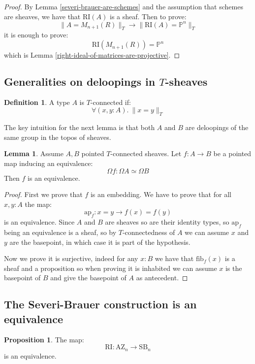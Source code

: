\documentclass[10pt,a4paper]{article}
\theoremstyle{definition}
\newtheorem{lemma}[theorem]{Lemma}
\newtheorem{definition}[theorem]{Definition}
\newtheorem{proposition}[theorem]{Proposition}
\newcommand{\SB}{\mathrm{SB}}
\newcommand{\RI}{\mathrm{RI}}
\newcommand{\AZ}{\mathrm{AZ}}
\newcommand{\propTrunc}[1]{\lVert #1 \rVert}
\newcommand{\bP}{\mathbb{P}}
\newcommand{\fib}{\mathrm{fib}}
\begin{document}
\begin{proof}
By Lemma \ref{severi-brauer-are-schemes} and the assumption that schemes are sheaves, we have that $\RI(A)$ is a sheaf. Then to prove:
\[\propTrunc{A=M_{n+1}(R)}_T \to \propTrunc{\RI(A)=\bP^n}_T\]
it is enough to prove:
\[\RI(M_{n+1}(R)) = \bP^n\]
which is Lemma \ref{right-ideal-of-matrices-are-projective}.
\end{proof}


\subsection{Generalities on deloopings in $T$-sheaves}

\begin{definition}
A type $A$ is $T$-connected if:
\[\forall(x,y:A).\ \propTrunc{x=y}_T\]
\end{definition}

The key intuition for the next lemma is that both $A$ and $B$ are deloopings of the same group in the topos of sheaves.

\begin{lemma}\label{deloopings-equivalence}
Assume $A,B$ pointed $T$-connected sheaves. Let $f:A\to B$ be a pointed map inducing an equivalence:
\[\Omega f : \Omega A \simeq \Omega B\]
Then $f$ is an equivalence.
\end{lemma}

\begin{proof}
First we prove that $f$ is an embedding. We have to prove that for all $x,y:A$ the map:
\[\mathrm{ap}_f : x=y \to f(x)=f(y)\]
is an equivalence. Since $A$ and $B$ are sheaves so are their identity types, so $\mathrm{ap}_f$ being an equivalence is a sheaf, so by $T$-connectedness of $A$ we can assume $x$ and $y$ are the basepoint, in which case it is part of the hypothesis.

Now we prove it is surjective, indeed for any $x:B$ we have that $\fib_f(x)$ is a sheaf and a proposition so when proving it is inhabited we can assume $x$ is the basepoint of $B$ and give the basepoint of $A$ as antecedent.
\end{proof}



\subsection{The Severi-Brauer construction is an equivalence}

\begin{proposition}\label{right-ideal-is-equivalence}
The map:
\[\RI:\AZ_n\to\SB_n\]
is an equivalence.
\end{proposition}
\end{document}
